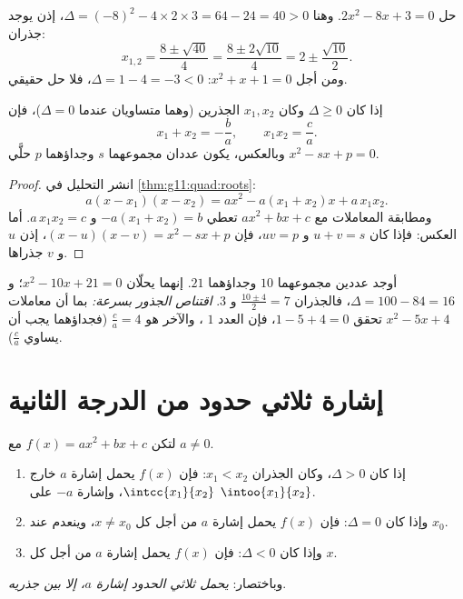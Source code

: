 \begin{example}\label{ex:g11:quad:solving}
حل $2x^2 - 8x + 3 = 0$. وهنا $\Delta = (-8)^2 - 4 \times 2 \times 3 =
64 - 24 = 40 > 0$، إذن يوجد جذران:
\[
x_{1,2} = \frac{8 \pm \sqrt{40}}{4} = \frac{8 \pm 2\sqrt{10}}{4}
= 2 \pm \frac{\sqrt{10}}{2}.
\]
ومن أجل $x^2 + x + 1 = 0$: $\Delta = 1 - 4 = -3 < 0$، فلا حل حقيقي.
\end{example}

\begin{proposition}\label{prop:g11:quad:vieta}
إذا كان $\Delta \geq 0$ وكان $x_1, x_2$ الجذرين (وهما متساويان عندما $\Delta = 0$)،
فإن
\[
x_1 + x_2 = -\frac{b}{a},
\qquad
x_1 x_2 = \frac{c}{a} .
\]
وبالعكس، يكون عددان مجموعهما $s$ وجداؤهما $p$ حلَّي
$x^2 - sx + p = 0$.
\end{proposition}

\begin{proof}
انشر التحليل في \cref{thm:g11:quad:roots}:
\[
a(x - x_1)(x - x_2) = a x^2 - a(x_1 + x_2)x + a\,x_1 x_2 .
\]
ومطابقة المعاملات مع $ax^2 + bx + c$ تعطي
$-a(x_1+x_2) = b$ و $a\,x_1x_2 = c$. أما العكس: فإذا كان $u + v = s$ و
$uv = p$، فإن $(x-u)(x-v) = x^2 - sx + p$، إذن $u$ و $v$ جذراها.
\end{proof}

\begin{example}
أوجد عددين مجموعهما $10$ وجداؤهما $21$. إنهما يحلّان
$x^2 - 10x + 21 = 0$؛ و $\Delta = 100 - 84 = 16$، فالجذران
$\frac{10 \pm 4}{2} = 7$ و $3$. \emph{اقتناص الجذور بسرعة:} بما أن
معاملات $x^2 - 5x + 4$ تحقق $1 - 5 + 4 = 0$، فإن العدد $1$
، والآخر هو $\frac{c}{a} = 4$ (فجداؤهما يجب أن يساوي
$\frac ca$).
\end{example}

\section{إشارة ثلاثي حدود من الدرجة الثانية}

\begin{theorem}\label{thm:g11:quad:sign}
لتكن $f(x) = ax^2+bx+c$ مع $a \neq 0$.
\begin{enumerate}
  \item إذا كان $\Delta > 0$، وكان الجذران $x_1 < x_2$: فإن $f(x)$ يحمل إشارة $a$
        خارج $\intcc{x_1}{x_2}$، وإشارة $-a$ على
        $\intoo{x_1}{x_2}$.
  \item وإذا كان $\Delta = 0$: فإن $f(x)$ يحمل إشارة $a$ من أجل كل $x \neq x_0$،
        وينعدم عند $x_0$.
  \item وإذا كان $\Delta < 0$: فإن $f(x)$ يحمل إشارة $a$ من أجل كل $x$.
\end{enumerate}
وباختصار: \emph{يحمل ثلاثي الحدود إشارة $a$، إلا بين جذريه}.
\end{theorem}

